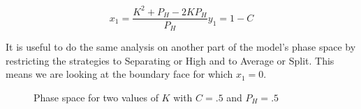 \documentclass[a4paper,10pt]{article}
\numberwithin{equation}{section}
\begin{document}
\begin{subequations}
\label{eq:Position2D-12}
\begin{equation}
{x_1}=\frac{K^2+P_H-2 K P_H}{P_H}
\end{equation}
\begin{equation}
{y_1}=1-C
\end{equation}
\end{subequations}

It is useful to do the same analysis on another part of the model's phase space by restricting the strategies to Separating or High and to Average or Split. This means we are looking at the boundary face for which $x_1=0$.
 
\begin{figure}[h]
\begin{center}
\hfill
{}
\end{center}
\caption{Phase space for two values of $K$ with $C=.5$ and $P_H=.5$}
\label{fig:Graph18.png and fig:Graph19.png}
\end{figure}
\end{document}
